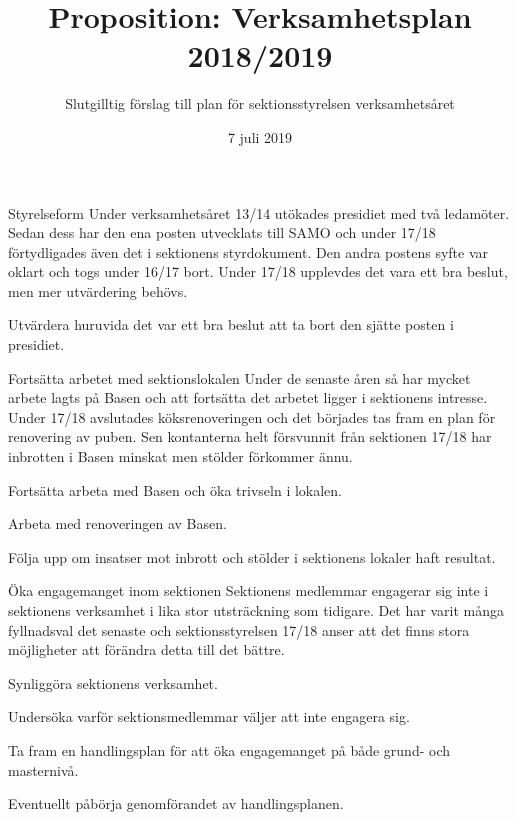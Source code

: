 \documentclass{dTeX-base}
\title{Proposition: Verksamhetsplan 2018/2019}
\subtitle{Slutgilltig förslag till plan för sektionsstyrelsen verksamhetsåret}
\author{}
\date{7 juli 2019}
\begin{document}
  \makeheadfoot%
  \maketitle

  \begin{FokusPunkt}{Styrelseform}{%
    Under verksamhetsåret 13/14 utökades presidiet med två ledamöter. Sedan
    dess har den ena posten utvecklats till SAMO och under 17/18 förtydligades
    även det i sektionens styrdokument. Den andra postens syfte var oklart och
    togs under 16/17 bort. Under 17/18 upplevdes det vara ett bra beslut, men
    mer utvärdering behövs.
  }
    \item Utvärdera huruvida det var ett bra beslut att ta bort den sjätte
      posten i presidiet.
  \end{FokusPunkt}

  \begin{FokusPunkt}{Fortsätta arbetet med sektionslokalen}{
    Under de senaste åren så har mycket arbete lagts på Basen och att fortsätta
    det arbetet ligger i sektionens intresse. Under 17/18 avslutades
    köksrenoveringen och det börjades tas fram en plan för renovering av puben.
    Sen kontanterna helt försvunnit från sektionen 17/18 har inbrotten i Basen
    minskat men stölder förkommer ännu.
  }
    \item Fortsätta arbeta med Basen och öka trivseln i lokalen.
    \item Arbeta med renoveringen av Basen.
    \item Följa upp om insatser mot inbrott och stölder i sektionens lokaler
      haft resultat.
  \end{FokusPunkt}

  \begin{FokusPunkt}{Öka engagemanget inom sektionen}{
    Sektionens medlemmar engagerar sig inte i sektionens verksamhet i lika stor
    utsträckning som tidigare. Det har varit många fyllnadsval det senaste och
    sektionsstyrelsen 17/18 anser att det finns stora möjligheter att förändra
    detta till det bättre.
  }
    \item Synliggöra sektionens verksamhet.
    \item Undersöka varför sektionsmedlemmar väljer att inte engagera sig.
    \item Ta fram en handlingsplan för att öka engagemanget på både grund- och
      masternivå.
    \item Eventuellt påbörja genomförandet av handlingsplanen.
  \end{FokusPunkt}
\end{document}
